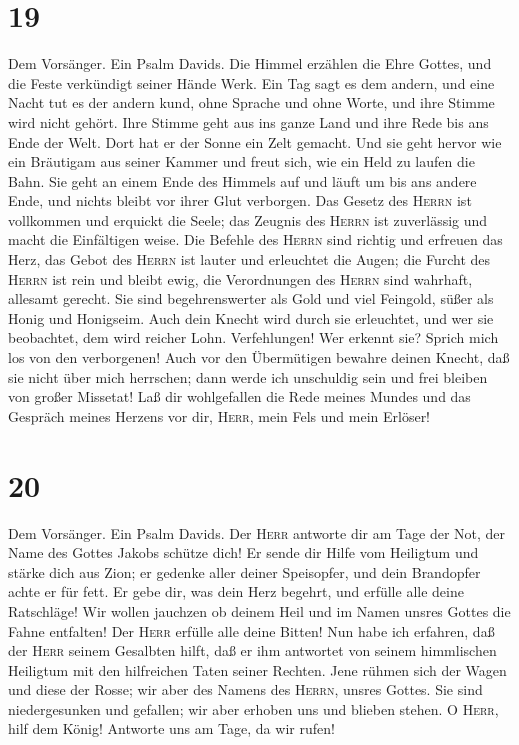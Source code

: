 \hypertarget{section-18}{%
\section{19}\label{section-18}}

 Dem Vorsänger. Ein Psalm Davids. Die Himmel erzählen die
Ehre Gottes, und die Feste verkündigt seiner Hände Werk. 
Ein Tag sagt es dem andern, und eine Nacht tut es der andern kund,
 ohne Sprache und ohne Worte, und ihre Stimme wird nicht
gehört.  Ihre Stimme geht aus ins ganze Land und ihre Rede
bis ans Ende der Welt. Dort hat er der Sonne ein Zelt gemacht.
 Und sie geht hervor wie ein Bräutigam aus seiner Kammer
und freut sich, wie ein Held zu laufen die Bahn.  Sie geht
an einem Ende des Himmels auf und läuft um bis ans andere Ende, und
nichts bleibt vor ihrer Glut verborgen.  Das Gesetz des
\textsc{Herrn} ist vollkommen und erquickt die Seele; das Zeugnis des
\textsc{Herrn} ist zuverlässig und macht die Einfältigen weise.
 Die Befehle des \textsc{Herrn} sind richtig und erfreuen
das Herz, das Gebot des \textsc{Herrn} ist lauter und erleuchtet die
Augen;  die Furcht des \textsc{Herrn} ist rein und bleibt
ewig, die Verordnungen des \textsc{Herrn} sind wahrhaft, allesamt
gerecht.  Sie sind begehrenswerter als Gold und viel
Feingold, süßer als Honig und Honigseim.  Auch dein
Knecht wird durch sie erleuchtet, und wer sie beobachtet, dem wird
reicher Lohn.  Verfehlungen! Wer erkennt sie? Sprich mich
los von den verborgenen!  Auch vor den Übermütigen
bewahre deinen Knecht, daß sie nicht über mich herrschen; dann werde ich
unschuldig sein und frei bleiben von großer Missetat! 
Laß dir wohlgefallen die Rede meines Mundes und das Gespräch meines
Herzens vor dir, \textsc{Herr}, mein Fels und mein Erlöser!

\hypertarget{section-19}{%
\section{20}\label{section-19}}

 Dem Vorsänger. Ein Psalm Davids. Der \textsc{Herr}
antworte dir am Tage der Not, der Name des Gottes Jakobs schütze dich!
 Er sende dir Hilfe vom Heiligtum und stärke dich aus
Zion;  er gedenke aller deiner Speisopfer, und dein
Brandopfer achte er für fett.  Er gebe dir, was dein Herz
begehrt, und erfülle alle deine Ratschläge!  Wir wollen
jauchzen ob deinem Heil und im Namen unsres Gottes die Fahne entfalten!
Der \textsc{Herr} erfülle alle deine Bitten!  Nun habe ich
erfahren, daß der \textsc{Herr} seinem Gesalbten hilft, daß er ihm
antwortet von seinem himmlischen Heiligtum mit den hilfreichen Taten
seiner Rechten.  Jene rühmen sich der Wagen und diese der
Rosse; wir aber des Namens des \textsc{Herrn}, unsres Gottes.
 Sie sind niedergesunken und gefallen; wir aber erhoben
uns und blieben stehen.  O \textsc{Herr}, hilf dem König!
Antworte uns am Tage, da wir rufen!

